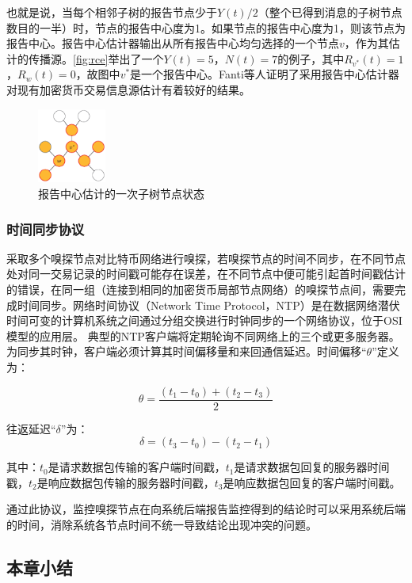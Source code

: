 \documentclass[supercite]{HustGraduPaper}
\newcommand{\xfig}[3]{
  \begin{figure}[htb]
    \centering
    #3
    \caption{#2}
    \label{fig:#1}
  \end{figure}
}
\newcommand{\rfig}[1]{\autoref{fig:#1}}
\theoremstyle{definition}
\begin{document}
也就是说，当每个相邻子树的报告节点少于$Y(t)/2$（整个已得到消息的子树节点数目的一半）时，节点的报告中心度为1。如果节点的报告中心度为1，则该节点为报告中心。报告中心估计器输出从所有报告中心均匀选择的一个节点$v$，作为其估计的传播源。\rfig{rce}举出了一个$Y(t)=5$，$N(t)=7$的例子，其中$R_{v^*}(t)=1$，$R_{w}(t)=0$，故图中$v^*$是一个报告中心。Fanti等人证明了\cite{fanti2017anonymity,fanti2017deanonymization}采用报告中心估计器对现有加密货币交易信息源估计有着较好的结果。
\xfig{rce}{报告中心估计的一次子树节点状态}{
  \includegraphics[width=0.2\textwidth]{images/2.4-rce.ps}
}


\subsubsection{时间同步协议}\label{timesync}
采取多个嗅探节点对比特币网络进行嗅探，若嗅探节点的时间不同步，在不同节点处对同一交易记录的时间戳可能存在误差，在不同节点中便可能引起首时间戳估计的错误，在同一组（连接到相同的加密货币局部节点网络）的嗅探节点间，需要完成时间同步。网络时间协议\cite{mills2010network}（Network Time Protocol，NTP）是在数据网络潜伏时间可变的计算机系统之间通过分组交换进行时钟同步的一个网络协议，位于OSI模型的应用层。
典型的NTP客户端将定期轮询不同网络上的三个或更多服务器。为同步其时钟，客户端必须计算其时间偏移量和来回通信延迟。时间偏移“$\theta$”定义为：

\begin{equation}
  \theta=\frac{(t_1-t_0 )+(t_2-t_3)}{2}
\end{equation}

往返延迟“$\delta$”为：
\begin{equation}
  \delta=(t_3-t_0 )-(t_2-t_1)
\end{equation}

其中：$t_0$是请求数据包传输的客户端时间戳，$t_1$是请求数据包回复的服务器时间戳，$t_2$是响应数据包传输的服务器时间戳，$t_3$是响应数据包回复的客户端时间戳。

通过此协议，监控嗅探节点在向系统后端报告监控得到的结论时可以采用系统后端的时间，消除系统各节点时间不统一导致结论出现冲突的问题。

\subsection{本章小结}
\end{document}
